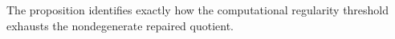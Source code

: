 The proposition identifies exactly how the computational regularity threshold exhausts the nondegenerate repaired quotient.